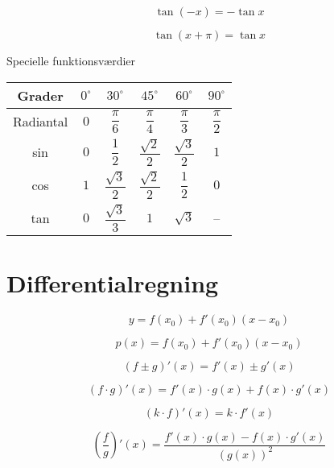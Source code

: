 \documentclass[11pt,a4paper,landscape,twocolumn,fleqn,leqno]{article}
\begin{document}
\begin{equation}
\tan(-x) = -\tan x
\end{equation}

\begin{equation}
\tan(x+\pi) = \tan x
\end{equation}

Specielle funktionsværdier

\begin{tabular}{c|c c c c c}
\hline
Grader       & $0^{\circ}$ & $30^{\circ}$ & $45^{\circ}$ & $60^{\circ}$ & $90^{\circ}$ \\
\hline
Radiantal    & $0$ & $\dfrac{\pi}{6}$ & $\dfrac{\pi}{4}$ & $\dfrac{\pi}{3}$ & $\dfrac{\pi}{2}$ \\
\hline
sin          & $0$ & $\dfrac{1}{2}$ & $\dfrac{\sqrt{2}}{2}$ & $\dfrac{\sqrt{3}}{2}$ & $1$ \\
\hline
cos          & $1$ & $\dfrac{\sqrt{3}}{2}$ & $\dfrac{\sqrt{2}}{2}$ & $\dfrac{1}{2}$ & $0$ \\
\hline
tan          & $0$ & $\dfrac{\sqrt{3}}{3}$ & $1$ & $\sqrt{3}$ & -- \\
\hline
\end{tabular}

\section{Differentialregning}

\begin{equation}
y = f(x_0) + f'(x_0)(x-x_0)
\end{equation}

\begin{equation}
p(x) = f(x_0) + f'(x_0)(x-x_0)
\end{equation}

\begin{equation}
\left(f \pm g\right)'(x) = f'(x) \pm g'(x)
\end{equation}

\begin{equation}
\left(f \cdot g\right)'(x) = f'(x) \cdot g(x) + f(x) \cdot g'(x)
\end{equation}

\begin{equation}
\left(k \cdot f\right)'(x) = k \cdot f'(x)
\end{equation}

\begin{equation}
\left(\frac{f}{g}\right)'(x) = \frac{f'(x) \cdot g(x) - f(x) \cdot g'(x)}{\left(g(x)\right)^2}
\end{equation}
\end{document}
